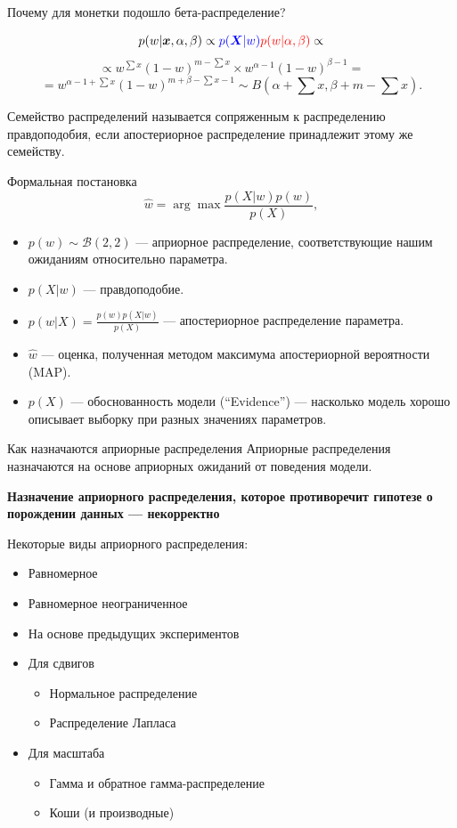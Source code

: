 \documentclass[9pt,pdf,utf8,hyperref={unicode},aspectratio=169]{beamer}
\begin{document}
\begin{frame}{Почему для монетки подошло бета-распределение?}

$$p({w}|\boldsymbol{x}, \alpha, \beta) \propto \textcolor{blue}{p(\boldsymbol{X}|{w})}\textcolor{red}{p(w|\alpha, \beta)} \propto $$
$$ \propto w^{\sum {x}} (1-w)^{m - \sum{x}} \times  w^{\alpha-1}(1 - w)^{\beta - 1}  =$$
$$ = w^{\alpha-1 + \sum{x}}(1-w)^{m + \beta - \sum{x} - 1} \sim B(\alpha + \sum{x}, \beta + m - \sum{x}).$$

Семейство распределений называется сопряженным к распределению правдоподобия, если апостериорное распределение принадлежит этому же семейству.
\end{frame}


\begin{frame}{Формальная постановка}
\[
\hat{w} = \arg\max \frac{p(X|w)p(w)}{p(X)},
\]
\begin{itemize}
\item $p(w) \sim \mathcal{B}(2,2)$ --- априорное распределение, соответствующие нашим ожиданиям относительно параметра.
\item $p(X|w)$ --- правдоподобие.
\item $p(w|X) = \frac{p(w)p(X|w)}{p(X)}$ --- апостериорное распределение параметра.
\item $\hat{w}$ --- оценка, полученная методом максимума апостериорной вероятности (MAP).
\item $p(X)$ --- обоснованность модели (``Evidence'') --- насколько модель хорошо описывает выборку при разных значениях параметров.
\end{itemize}

\end{frame}


\begin{frame}{Как назначаются априорные распределения}
Априорные распределения назначаются на основе априорных ожиданий от поведения модели.

\textbf{Назначение априорного распределения, которое противоречит гипотезе о порождении данных --- некорректно}

Некоторые виды априорного распределения:
\begin{itemize}
\item Равномерное
\item Равномерное неограниченное
\item На основе предыдущих экспериментов
\item Для сдвигов
\begin{itemize}
\item Нормальное распределение
\item Распределение Лапласа
\end{itemize}
\item Для масштаба
\begin{itemize}
\item Гамма и обратное гамма-распределение
\item Коши (и производные)
\end{itemize}

\end{itemize}

\end{frame}
\end{document}
